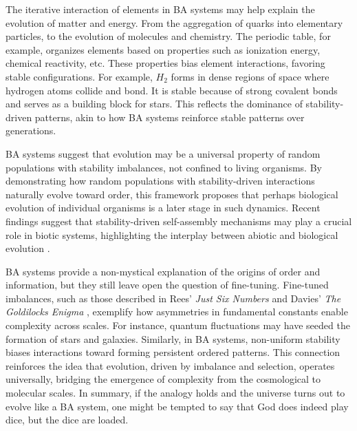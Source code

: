 \documentclass[entropy,article,submit,pdftex,moreauthors]{Definitions/mdpi}
\begin{document}
The iterative interaction of elements in BA systems may help explain the evolution of matter and energy. From the aggregation of quarks into elementary particles, to the evolution of molecules and chemistry. The periodic table, for example, organizes elements based on properties such as ionization energy, chemical reactivity, etc. These properties bias element interactions, favoring stable configurations. For example, \( H_2 \) forms in dense regions of space where hydrogen atoms collide and bond. It is stable because of strong covalent bonds and serves as a building block for stars. This reflects the dominance of stability-driven patterns, akin to how BA systems reinforce stable patterns over generations. 

BA systems suggest that evolution may be a universal property of random populations with stability imbalances, not confined to living organisms. By demonstrating how random populations with stability-driven interactions naturally evolve toward order, this framework proposes that perhaps biological evolution of individual organisms is a later stage in such dynamics. Recent findings suggest that stability-driven self-assembly mechanisms may play a crucial role in biotic systems, highlighting the interplay between abiotic and biological evolution \cite{davies2022selfassembly}.

BA systems provide a non-mystical explanation of the origins of order and information, but they still leave open the question of fine-tuning. Fine-tuned imbalances, such as those described in Rees' \textit{Just Six Numbers} \cite{rees2000just} and Davies' \textit{The Goldilocks Enigma} \cite{davies2006goldilocks}, exemplify how asymmetries in fundamental constants enable complexity across scales. For instance, quantum fluctuations may have seeded the formation of stars and galaxies. Similarly, in BA systems,  non-uniform stability biases interactions toward forming persistent ordered patterns. This connection reinforces the idea that evolution, driven by imbalance and selection, operates universally, bridging the emergence of complexity from the cosmological to molecular scales. In summary, if the analogy holds and the universe turns out to evolve like a BA system, one might be tempted to say that God does indeed play dice, but the dice are loaded.


\end{document}
